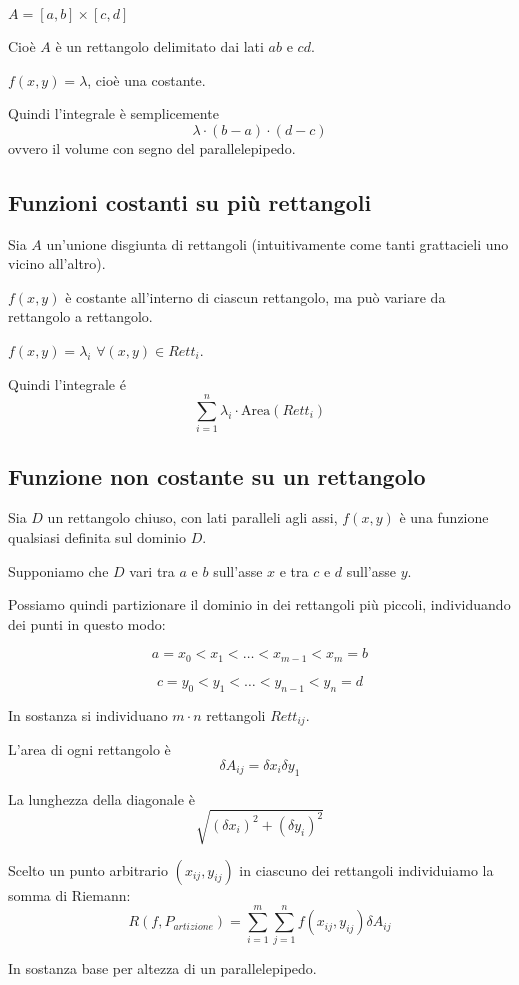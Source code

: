 $A= [a,b] \times [c,d]$

Cioè $A$ è un rettangolo delimitato dai lati $ab$ e $cd$.

$f(x,y) = \lambda$, cioè una costante.

Quindi l'integrale è semplicemente $$\lambda \cdot (b-a) \cdot (d-c)$$ ovvero il volume con segno del parallelepipedo.

\subsection{Funzioni costanti su più rettangoli}

Sia $A$ un'unione disgiunta di rettangoli (intuitivamente come tanti grattacieli uno vicino all'altro).

$f(x,y)$ è costante all'interno di ciascun rettangolo, ma può variare da rettangolo a rettangolo.

$f(x,y) = \lambda_i$ $\forall (x,y) \in Rett_i$.

Quindi l'integrale é $$\sum_{i=1}^{n} \lambda_i \cdot \text{Area}(Rett_i)$$

\subsection{Funzione non costante su un rettangolo}

Sia $D$ un rettangolo chiuso, con lati paralleli agli assi, $f(x,y)$ è una funzione qualsiasi definita sul dominio $D$.

Supponiamo che $D$ vari tra $a$ e $b$ sull'asse $x$ e tra $c$ e $d$ sull'asse $y$.

Possiamo quindi partizionare il dominio in dei rettangoli più piccoli, individuando dei punti in questo modo:

$$a = x_0 < x_1 < \ldots < x_{m-1} < x_m = b$$


$$c = y_0 < y_1 < \ldots < y_{n-1} < y_n = d$$

In sostanza si individuano $m \cdot n$ rettangoli $Rett_{ij}$.

L'area di ogni rettangolo è $$\delta A_{ij} = \delta x_i \delta y_1$$

La lunghezza della diagonale è
$$\sqrt{(\delta x_i)^2+(\delta y_i)^2}$$

Scelto un punto arbitrario $(x_{ij},y_{ij})$ in ciascuno dei rettangoli individuiamo la somma di Riemann:
$$R(f,P_{artizione}) = \sum^m_{i=1} \sum^n_{j=1} f(x_{ij},y_{ij}) \delta A_{ij}$$

In sostanza base per altezza di un parallelepipedo.

